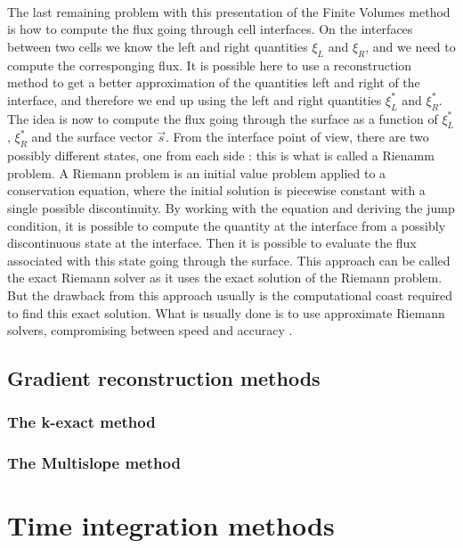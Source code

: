       \paragraph{}
      The last remaining problem with this presentation of the Finite Volumes method is how to compute the flux going through cell interfaces.
      On the interfaces between two cells we know the left and right quantities $\xi_L$ and $\xi_R$, and we need to compute the corresponging flux.
      It is possible here to use a reconstruction method to get a better approximation of the quantities left and right of the interface, and therefore we end up using the left and right quantities $\xi_L^*$ and $\xi_R^*$.
      The idea is now to compute the flux going through the surface as a function of $\xi_L^*$, $\xi_R^*$ and the surface vector $\vec{s}$.
      From the interface point of view, there are two possibly different states, one from each side : this is what is called a Rienamm problem.
      A Riemann problem is an initial value problem applied to a conservation equation, where the initial solution is piecewise constant with a single possible discontinuity.
      By working with the equation and deriving the jump condition, it is possible to compute the quantity at the interface from a possibly discontinuous state at the interface.
      Then it is possible to evaluate the flux associated with this state going through the surface.
      This approach can be called the exact Riemann solver as it uses the exact solution of the Riemann problem.
      But the drawback from this approach usually is the computational coast required to find this exact solution.
      What is usually done is to use approximate Riemann solvers, compromising between speed and accuracy \cite{Toro2009}.





    \subsection{Gradient reconstruction methods}
      \subsubsection{The k-exact method}
      \subsubsection{The Multislope method}


  \section{Time integration methods}
